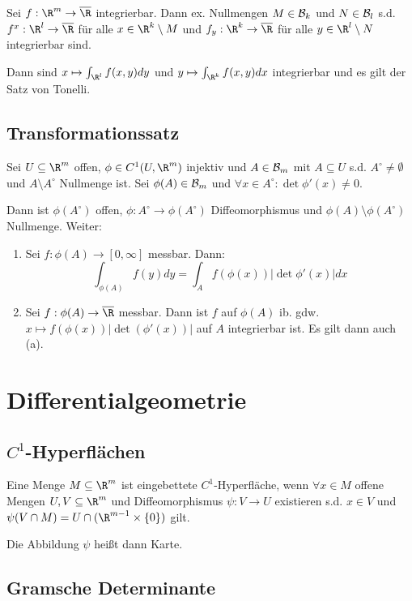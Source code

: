 Sei $f : \R^m \to \overline\R$ integrierbar. Dann ex. Nullmengen $M \in \mathcal{B}_k$ und $N \in \mathcal{B}_l$ s.d. $f^x : \R^l \to \overline\R$ für alle $x \in \R^k \setminus M$ und $f_y : \R^k \to \overline\R$ für alle $y \in \R^l \setminus N$ integrierbar sind.

Dann sind $x \mapsto \int_{\R^l} f(x,y) dy$ und $y \mapsto \int_{\R^k} f(x,y) dx$ integrierbar und es gilt der Satz von Tonelli.

\subsection*{Transformationssatz}

Sei $U \subseteq \R^m$ offen, $\phi \in C^1(U,\R^m)$ injektiv und $A \in \mathcal{B}_m$ mit $A \subseteq U$ s.d. $A^\circ \neq \emptyset$ und $A \setminus A^\circ$ Nullmenge ist. Sei $\phi(A) \in \mathcal{B}_m$ und $\forall x \in A^\circ : \det \phi'(x) \neq 0$.

Dann ist $\phi(A^\circ)$ offen, $\phi : A^\circ \to \phi(A^\circ)$ Diffeomorphismus und $\phi(A) \setminus \phi(A^\circ)$ Nullmenge. Weiter:

\begin{enumerate}[label=(\alph*)]
	\item Sei $f: \phi(A) \to [0,\infty]$ messbar. Dann: \vspace{-2mm} $$\int_{\phi(A)} f(y) dy = \int_A f(\phi(x))|\det \phi'(x)| dx$$
	\item Sei $f : \phi(A) \to \overline\R$ messbar. Dann ist $f$ auf $\phi(A)$ ib. gdw. $x \mapsto f(\phi(x))|\det(\phi'(x))|$ auf $A$ integrierbar ist. Es gilt dann auch (a).
\end{enumerate}

\section*{Differentialgeometrie}

\subsection*{$C^1$-Hyperflächen}

Eine Menge $M \subseteq \R^m$ ist eingebettete $C^1$-Hyperfläche, wenn $\forall x \in M$ offene Mengen $U, V \subseteq \R^m$ und Diffeomorphismus $\psi : V \to U$ existieren s.d. $x \in V$ und $\psi(V \cap M) = U \cap (\R^{m-1} \times \{0\})$ gilt.

Die Abbildung $\psi$ heißt dann Karte.

\subsection*{Gramsche Determinante}

